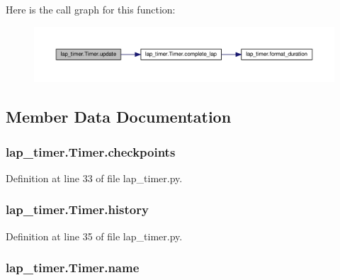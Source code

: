 Here is the call graph for this function\+:
\nopagebreak
\begin{figure}[H]
\begin{center}
\leavevmode
\includegraphics[width=350pt]{classlap__timer_1_1_timer_a0bed2d0b2adbe659360625983e0c6875_cgraph}
\end{center}
\end{figure}




\subsection{Member Data Documentation}
\subsubsection[{\texorpdfstring{checkpoints}{checkpoints}}]{\setlength{\rightskip}{0pt plus 5cm}lap\+\_\+timer.\+Timer.\+checkpoints}\hypertarget{classlap__timer_1_1_timer_a497cd7a079955a13b7722de46a841133}{}\label{classlap__timer_1_1_timer_a497cd7a079955a13b7722de46a841133}


Definition at line 33 of file lap\+\_\+timer.\+py.

\subsubsection[{\texorpdfstring{history}{history}}]{\setlength{\rightskip}{0pt plus 5cm}lap\+\_\+timer.\+Timer.\+history}\hypertarget{classlap__timer_1_1_timer_a7068a3c73d3386620181bbaee0a56604}{}\label{classlap__timer_1_1_timer_a7068a3c73d3386620181bbaee0a56604}


Definition at line 35 of file lap\+\_\+timer.\+py.

\subsubsection[{\texorpdfstring{name}{name}}]{\setlength{\rightskip}{0pt plus 5cm}lap\+\_\+timer.\+Timer.\+name}\hypertarget{classlap__timer_1_1_timer_a6fc67417278276bc1bd71aca1686107c}{}\label{classlap__timer_1_1_timer_a6fc67417278276bc1bd71aca1686107c}


